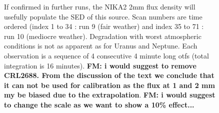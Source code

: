 \begin{figure}[p]
\begin{center}
{  If confirmed in further runs, the NIKA2 2mm flux density will usefully populate the SED of this source.  
    Scan numbers are time ordered (index 1 to 34 : run 9 (fair weather) and index 35 to 71 : run 10 (mediocre weather).
    Degradation with worst atmospheric conditions is not as apparent as for Uranus and Neptune.
    Each observation is a sequence of 4 consecutive 4 minute long otfs (total integration is 16 minutes).
    {\bf FM: i would suggest to remove CRL2688. From the discussion of the text we conclude that it can not be used for calibration as the
    flux at 1 and 2 mm my be biased due to the extrapolation}. 
    {\bf FM: i would suggest to change the scale as we want to show a 10\% effect...}}
\label{fig:ratio_cal_sec}
\end{center}
\end{figure}


